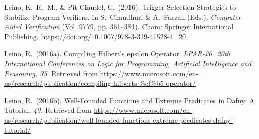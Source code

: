 \documentclass[12pt,twoside]{article}
\begin{document}
{\begin{thebibliography}{222}
Leino, K.~R.~M., \& Pit-Claudel, C.~(2016). Trigger Selection Strategies to Stabilize Program Verifiers. In S.~Chaudhuri \& A.~Farzan (Eds.), \emph{Computer Aided Verification} (Vol. 9779, pp. 361–381). Cham: Springer International Publishing. https://doi.org/\href{https://dx.doi.org/10.1007/978-3-319-41528-4_20}{10.1007/978-3-319-41528-4\_20}\label{chaudhuri_trigger_2016}%

\mdbibitemlabel{[R. Leino, 2016a]}Leino, R.~(2016a). Compiling Hilbert’s epsilon Operator. \emph{LPAR-20. 20th International Conferences on Logic for Programming, Artificial Intelligence and Reasoning}, \emph{35}. Retrieved from \href{https://www.microsoft.com/en-us/research/publication/compiling-hilberts-\%25cf\%25b5-operator/}{{\ttfamily https://\hspace{0pt}www.\hspace{0pt}microsoft.\hspace{0pt}com/\hspace{0pt}en-\hspace{0pt}us/\hspace{0pt}research/\hspace{0pt}publication/\hspace{0pt}compiling-\hspace{0pt}hilberts-\hspace{0pt}\hspace{0pt}\%cf\hspace{0pt}\%b5-\hspace{0pt}operator/\hspace{0pt}}}\label{leino_compiling_2016}%

\mdbibitemlabel{[R. Leino, 2016b]}Leino, R.~(2016b). Well-Founded Functions and Extreme Predicates in Dafny: A Tutorial, \emph{40}. Retrieved from \href{https://www.microsoft.com/en-us/research/publication/well-founded-functions-extreme-predicates-dafny-tutorial/}{{\ttfamily https://\hspace{0pt}www.\hspace{0pt}microsoft.\hspace{0pt}com/\hspace{0pt}en-\hspace{0pt}us/\hspace{0pt}research/\hspace{0pt}publication/\hspace{0pt}well-\hspace{0pt}founded-\hspace{0pt}functions-\hspace{0pt}extreme-\hspace{0pt}predicates-\hspace{0pt}dafny-\hspace{0pt}tutorial/\hspace{0pt}}}\label{leino_well-founded_2016}%


\end{thebibliography}}
\end{document}
